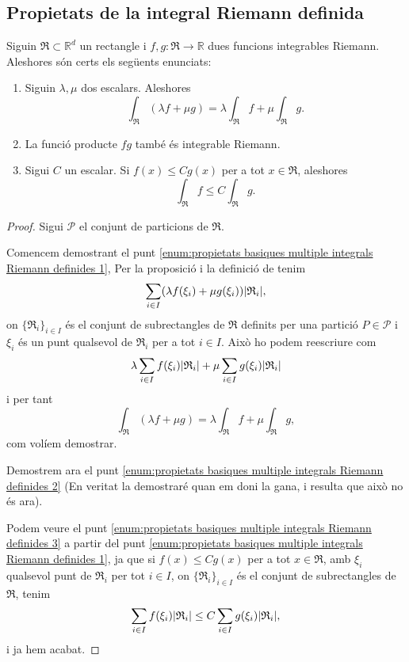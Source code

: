 \documentclass[../Apunts.tex]{subfiles}
\begin{document}
	\subsection{Propietats de la integral Riemann definida}
	\begin{proposition}
		\label{prop:propietats basiques multiple integrals Riemann definides}
		Siguin \(\mathfrak{R}\subset\mathbb{R}^{d}\) un rectangle i \(f,g\colon\mathfrak{R}\to\mathbb{R}\) dues funcions integrables Riemann. Aleshores són certs els següents enunciats:
		\begin{enumerate}
			\item\label{enum:propietats basiques multiple integrals Riemann definides 1} Siguin \(\lambda,\mu\) dos escalars. Aleshores
			\[\int_{\mathfrak{R}}(\lambda f+\mu g)=\lambda\int_{\mathfrak{R}}f+\mu\int_{\mathfrak{R}}g.\]
			\item\label{enum:propietats basiques multiple integrals Riemann definides 2} La funció producte \(fg\) també és integrable Riemann.
			\item\label{enum:propietats basiques multiple integrals Riemann definides 3} Sigui \(C\) un escalar. Si \(f(x)\leq Cg(x)\) per a tot \(x\in \mathfrak{R}\), aleshores \[\int_{\mathfrak{R}}f\leq C\int_{\mathfrak{R}}g.\]
		\end{enumerate} 
		\begin{proof}
			Sigui \(\mathcal{P}\) el conjunt de particions de \(\mathfrak{R}\).
			
			Comencem demostrant el punt \eqref{enum:propietats basiques multiple integrals Riemann definides 1}, Per la proposició  i la definició de  tenim
			\[\sum_{i\in I}\left(\lambda f(\xi_{i})+\mu g(\xi_{i})\right)\abs{\mathfrak{R}_{i}},\]
			on \(\{\mathfrak{R}_{i}\}_{i\in I}\) és el conjunt de subrectangles de \(\mathfrak{R}\) definits per una partició \(P\in\mathcal{P}\) i \(\xi_{i}\) és un punt qualsevol de \(\mathfrak{R}_{i}\) per a tot \(i\in I\). Això ho podem reescriure com
			\[\lambda\sum_{i\in I}f(\xi_{i})\abs{\mathfrak{R}_{i}}+\mu\sum_{i\in I}g(\xi_{i})\abs{\mathfrak{R}_{i}}\]
			i per tant
			\[\int_{\mathfrak{R}}(\lambda f+\mu g)=\lambda\int_{\mathfrak{R}}f+\mu\int_{\mathfrak{R}}g,\]
			com volíem demostrar.
			
			Demostrem ara el punt \eqref{enum:propietats basiques multiple integrals Riemann definides 2} (En veritat la demostraré quan em doni la gana, i resulta que això no és ara). %
			
			Podem veure el punt \eqref{enum:propietats basiques multiple integrals Riemann definides 3} a partir del punt \eqref{enum:propietats basiques multiple integrals Riemann definides 1}, ja que si \(f(x)\leq Cg(x)\) per a tot \(x\in \mathfrak{R}\), amb \(\xi_{i}\) qualsevol punt de \(\mathfrak{R}_{i}\) per tot \(i\in I\), on \(\{\mathfrak{R}_{i}\}_{i\in I}\) és el conjunt de subrectangles de \(\mathfrak{R}\), tenim
			\[\sum_{i\in I}f(\xi_{i})\abs{\mathfrak{R}_{i}}\leq C\sum_{i\in I}g(\xi_{i})\abs{\mathfrak{R}_{i}},\]
			i ja hem acabat.
		\end{proof}
	\end{proposition}
\end{document}
